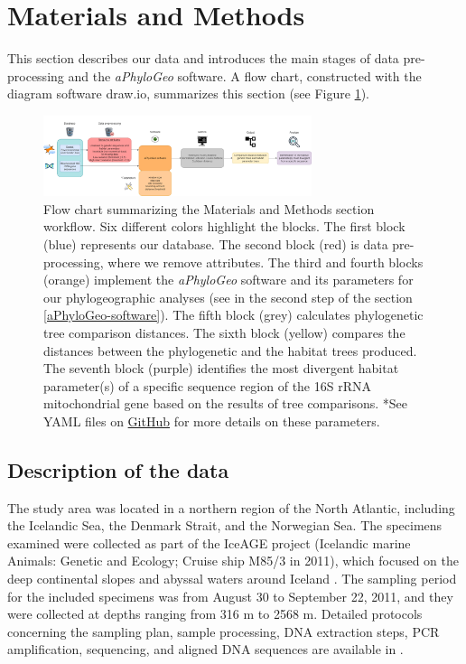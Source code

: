 \section{Materials and Methods}\label{materials-methods}
This section describes our data and introduces the main stages of data pre-processing and the \textit{aPhyloGeo} software. A flow chart, constructed with the diagram software draw.io, summarizes this section (see Figure \ref{fig:fig1}).

\begin{figure}[htbp]
    \centering
    \includegraphics[width=0.7\textwidth]{diagram.drawio.png}
    \caption{Flow chart summarizing the Materials and Methods section workflow. Six different colors highlight the blocks. The first block (blue) represents our database. The second block (red) is data pre-processing, where we remove attributes. The third and fourth blocks (orange) implement the \textit{aPhyloGeo} software and its parameters for our phylogeographic analyses (see in the second step of the section \autoref{aPhyloGeo-software}). The fifth block (grey) calculates phylogenetic tree comparison distances. The sixth block (yellow) compares the distances between the phylogenetic and the habitat trees produced. The seventh block (purple) identifies the most divergent habitat parameter(s) of a specific sequence region of the 16S rRNA mitochondrial gene based on the results of tree comparisons. *See YAML files on \href{https://github.com/tahiri-lab/aPhyloGeo}{GitHub} for more details on these parameters. \label{fig:fig1}}
\end{figure}

\subsection{Description of the data}
The study area was located in a northern region of the North Atlantic, including the Icelandic Sea, the Denmark Strait, and the Norwegian Sea. The specimens examined were collected as part of the IceAGE project (Icelandic marine Animals: Genetic and Ecology; Cruise ship M85/3 in 2011), which focused on the deep continental slopes and abyssal waters around Iceland \citep{meisner_prefacebiodiversity_2018}. The sampling period for the included specimens was from August 30 to September 22, 2011, and they were collected at depths ranging from 316 m to 2568 m. Detailed protocols concerning the sampling plan, sample processing, DNA extraction steps, PCR amplification, sequencing, and aligned DNA sequences are available in \citep{uhlir_adding_2021}.

